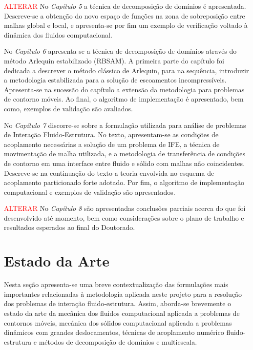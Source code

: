 \documentclass[tese_patricia.tex]{subfiles}
\begin{document}
\textcolor{red}{ALTERAR}
No \textit{Capítulo 5} a técnica de decomposição de domínios é apresentada. Descreve-se a obtenção do novo espaço de funções na zona de sobreposição entre malhas global e local, e apresenta-se por fim um exemplo de verificação voltado à dinâmica dos fluidos computacional.

No \textit{Capítulo 6} apresenta-se a técnica de decomposição de domínios através do método Arlequin estabilizado (RBSAM). A primeira parte do capítulo foi dedicada a descrever o método clássico de Arlequin, para na sequência, introduzir a metodologia estabilizada para a solução de escoamentos incompressíveis. Apresenta-se na sucessão do capítulo a extensão da metodologia para problemas de contorno móveis. Ao final, o algoritmo de implementação é apresentado, bem como, exemplos de validação são avaliados.

No \textit{Capítulo 7} discorre-se sobre a formulação utilizada para análise de problemas de Interação Fluido-Estrutura. No texto, apresentam-se as condições de acoplamento necessárias a solução de um problema de IFE, a técnica de movimentação de malha utilizada, e a metodologia de transferência de condições de contorno em uma interface entre fluido e sólido com malhas não coincidentes. Descreve-se na continuação do texto a teoria envolvida no esquema de acoplamento particionado forte adotado. Por fim, o algoritmo de implementação computacional e exemplos de validação são apresentados.

\textcolor{red}{ALTERAR} No \textit{Capítulo 8} são apresentadas conclusões parciais acerca do que foi desenvolvido até momento, bem como considerações sobre o plano de trabalho e resultados esperados ao final do Doutorado.


\section[Estado da Arte]{Estado da Arte}\label{section:estado_da_arte}

Nesta seção apresenta-se uma breve contextualização das formulações mais importantes relacionadas à metodologia aplicada neste projeto para a resolução dos problemas de interação fluido-estrutura. Assim, aborda-se brevemente o estado da arte da mecânica dos fluidos computacional aplicada a problemas de contornos móveis, mecânica dos sólidos computacional aplicada a problemas dinâmicos com grandes deslocamentos, técnicas de acoplamento numérico fluido-estrutura e métodos de decomposição de domínios e multiescala.
\end{document}
